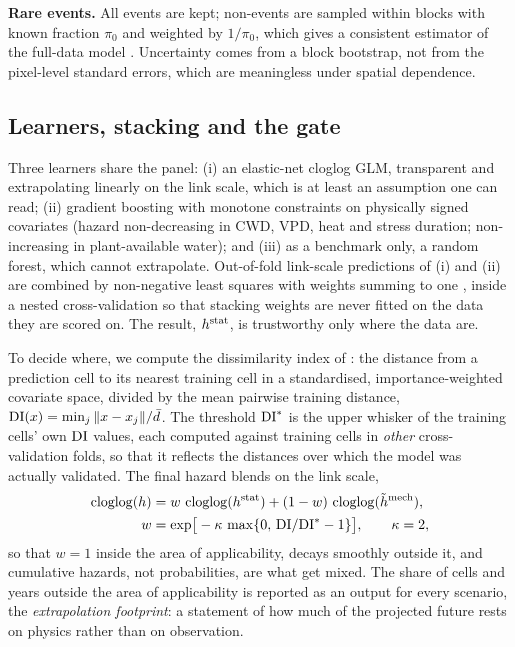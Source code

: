 \textbf{Rare events.} All events are kept; non-events are sampled within blocks with known fraction $\pi_0$ and weighted by $1/\pi_0$, which gives a consistent estimator of the full-data model \citep{King2001}. Uncertainty comes from a block bootstrap, not from the pixel-level standard errors, which are meaningless under spatial dependence.

\subsection{Learners, stacking and the gate}\label{sec:gate}
Three learners share the panel: (i) an elastic-net cloglog GLM, transparent and extrapolating linearly on the link scale, which is at least an assumption one can read; (ii) gradient boosting with monotone constraints on physically signed covariates (hazard non-decreasing in CWD, VPD, heat and stress duration; non-increasing in plant-available water); and (iii) as a benchmark only, a random forest, which cannot extrapolate. Out-of-fold link-scale predictions of (i) and (ii) are combined by non-negative least squares with weights summing to one \citep{Wolpert1992,Breiman1996}, inside a nested cross-validation so that stacking weights are never fitted on the data they are scored on. The result, $h^{\text{stat}}$, is trustworthy only where the data are.

To decide where, we compute the dissimilarity index of \citet{Meyer2021}: the distance from a prediction cell to its nearest training cell in a standardised, importance-weighted covariate space, divided by the mean pairwise training distance, $\mathrm{DI}(x)=\min_j\|x-x_j\|/\bar d$. The threshold $\mathrm{DI}^\ast$ is the upper whisker of the training cells' own $\mathrm{DI}$ values, each computed against training cells in \emph{other} cross-validation folds, so that it reflects the distances over which the model was actually validated. The final hazard blends on the link scale,
\begin{equation}\label{eq:gate}
\begin{aligned}
\operatorname{cloglog}(h)&=w\,\operatorname{cloglog}(h^{\text{stat}})+(1-w)\,\operatorname{cloglog}(\tilde h^{\text{mech}}),\\
w&=\exp\!\big[-\kappa\,\max\{0,\,\mathrm{DI}/\mathrm{DI}^\ast-1\}\big],\qquad\kappa=2,
\end{aligned}
\end{equation}
so that $w=1$ inside the area of applicability, decays smoothly outside it, and cumulative hazards, not probabilities, are what get mixed. The share of cells and years outside the area of applicability is reported as an output for every scenario, the \emph{extrapolation footprint}: a statement of how much of the projected future rests on physics rather than on observation.

